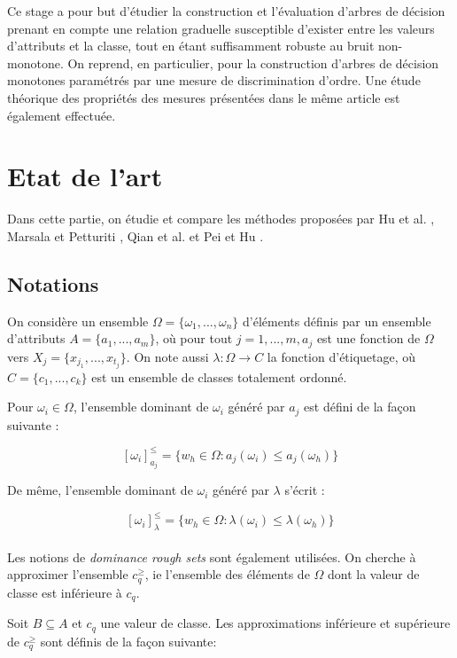 \documentclass[a4paper]{article}
\begin{document}
Ce stage a pour but d'étudier la construction et l'évaluation d'arbres de
décision prenant en compte une relation graduelle susceptible d'exister entre
les valeurs d'attributs et la classe, tout en étant suffisamment robuste au
bruit non-monotone. On reprend, en particulier, \cite{marsala-rank} pour la
construction d'arbres de décision monotones paramétrés par une mesure de
discrimination d'ordre. Une étude théorique des propriétés des mesures présentées
dans le même article est également effectuée.\\

\section{Etat de l'art} 
Dans cette partie, on étudie et compare les méthodes proposées par Hu et al.
\cite{hu-rank}, Marsala et Petturiti \cite{marsala-rank}, Qian et al.
\cite{qian-fusing} et Pei et Hu \cite{pei-partially}.

\subsection{Notations}
On considère un ensemble $\Omega = \{\omega_1,...,\omega_n\}$ d'éléments définis
par un ensemble d'attributs $A = \{a_1,...,a_m\}$, où pour tout $j=1,...,m, a_j$
est une fonction de $\Omega$ vers $X_j = \{x_{j_1},...,x_{t_j}\}$. On note aussi
$\lambda: \Omega \rightarrow C$ la fonction d'étiquetage, où $C =
\{c_1,...,c_k\}$ est un ensemble de classes totalement ordonné.

Pour $\omega_i \in \Omega$, l'ensemble dominant de $\omega_i$ généré par $a_j$
est défini de la façon suivante :

$$[\omega_i]^{\leq}_{a_j} = \{w_h \in \Omega : a_j(\omega_i) \leq a_j(\omega_h)\}$$

De même, l'ensemble dominant de $\omega_i$ généré par $\lambda$ s'écrit :

$$[\omega_i]^{\leq}_{\lambda} = \{w_h \in \Omega : \lambda(\omega_i) \leq
\lambda(\omega_h)\}$$ \\

Les notions de \textit{dominance rough sets} sont également utilisées. On
cherche à approximer l'ensemble $c^{\geq}_q$, ie l'ensemble des éléments de
$\Omega$ dont la valeur de classe est inférieure à $c_q$.

\noindent Soit $B \subseteq A$ et $c_q$ une valeur de classe. Les approximations
inférieure et supérieure de $c^{\geq}_q$ sont définis de la façon suivante:
\end{document}
